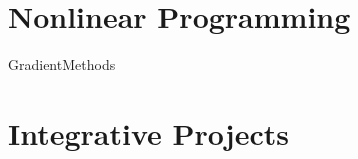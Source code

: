\documentclass[letter,12pt]{book}
\begin{document}







\part{Nonlinear Programming}
\label{part:NonlinearProgramming}





{GradientMethods}






\part{Integrative Projects}
\label{part:IntegrativeProjects}



\end{document}
